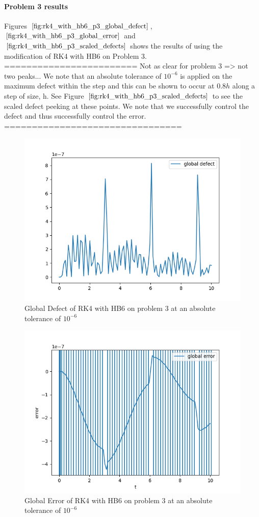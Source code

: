 \documentclass{article}
\begin{document}
\paragraph{Problem 3 results}
Figures $\ref{fig:rk4_with_hb6_p3_global_defect}$, $\ref{fig:rk4_with_hb6_p3_global_error}$ and $\ref{fig:rk4_with_hb6_p3_scaled_defects}$ shows the results of using the modification of RK4 with HB6 on Problem 3. 
======================== Not as clear for problem 3 => not two peaks...
We note that an absolute tolerance of $10^{-6}$ is applied on the maximum defect within the step and this can be shown to occur at $0.8h$ along a step of size, h. See Figure $\ref{fig:rk4_with_hb6_p3_scaled_defects}$ to see the scaled defect peeking at these points. We note that we successfully control the defect and thus successfully control the error.
================================

\begin{figure}[H]
\centering
\includegraphics[width=0.7\linewidth]{./figures/rk4_with_hb6_p3_global_defect}
\caption{Global Defect of RK4 with HB6 on problem 3 at an absolute tolerance of $10^{-6}$}
\label{fig:rk4_with_hb6_p3_global_defect}
\end{figure}

\begin{figure}[H]
\centering
\includegraphics[width=0.7\linewidth]{./figures/rk4_with_hb6_p3_global_error}
\caption{Global Error of RK4 with HB6 on problem 3 at an absolute tolerance of $10^{-6}$}
\label{fig:rk4_with_hb6_p3_global_error}
\end{figure}
\end{document}
